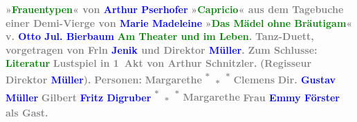            \pstart
           \centering{}\textcolor{gray}{\textbf{»\textcolor{green}{Frauentypen}{}\ledrightnote{\textcolor{green}{Frauentypen}}« von \textcolor{blue}{Arthur Pserhofer}{}\ledrightnote{\textcolor{blue}{Arthur Pserhofer}}}}\pend
           \pstart
           \noindent{}\centering{}\textcolor{gray}{\textbf{»\textcolor{green}{Capricio}{}\ledrightnote{\textcolor{green}{Auf Kypros}}« aus dem Tagebuche
                  einer Demi-Vierge von \textcolor{blue}{Marie Madeleine}{}\ledrightnote{\textcolor{blue}{Marie Madeleine}}}}\pend
           \pstart
           \noindent{}\centering{}\textcolor{gray}{\textbf{»\textcolor{green}{Das Mädel ohne Bräutigam}{}\ledrightnote{\textcolor{green}{Das Mädchen ohne Bräutigam}}« v.
                     \textcolor{blue}{Otto Jul. Bierbaum}{}\ledrightnote{\textcolor{blue}{Otto Julius Bierbaum}}}}\pend
           {\bigskip}\pstart
           \noindent{}\centering{}\textcolor{gray}{\textbf{\textcolor{green}{Am Theater und im Leben}{}\ledrightnote{\textcolor{green}{Am Theater und im Leben}}.}}\pend
           \pstart
           \noindent{}\centering{}\textcolor{gray}{\textbf{Tanz-Duett, vorgetragen von Frln \textcolor{blue}{\textbf{Jenik}}{}\ledrightnote{\textcolor{blue}{Hilda Jenik}} und Direktor \textcolor{blue}{\textbf{Müller}}{}\ledrightnote{\textcolor{blue}{Gustav Müller}}.}}\pend
           {\bigskip}\pstart
           \noindent{}\centering{}\textcolor{gray}{\textbf{Zum Schlusse:}}\pend
           \pstart
           \noindent{}\centering{}\textcolor{gray}{\textbf{\textcolor{green}{Literatur}{}\ledrightnote{\textcolor{green}{Literatur}}}}\pend
           \pstart
           \noindent{}\centering{}\textcolor{gray}{\textbf{Lustspiel in 1 Akt von Arthur Schnitzler.}}\pend
           \pstart
           \noindent{}\centering{}\textcolor{gray}{\textbf{(Regisseur Direktor \textcolor{blue}{Müller}{}\ledrightnote{\textcolor{blue}{Gustav Müller}}).}}\pend
           \pstart
           \noindent{}\centering{}\textcolor{gray}{\textbf{Personen:}}\pend
           \pstart
           \noindent{}\textcolor{gray}{\textbf{Margarethe }}\hfill \textcolor{gray}{\textbf{\textsuperscript{*} \textsubscript{*} \textsuperscript{*}}}\pend
           \pstart
           \textcolor{gray}{\textbf{Clemens }}\hfill \textcolor{gray}{\textbf{Dir. \textcolor{blue}{Gustav Müller}{}\ledrightnote{\textcolor{blue}{Gustav Müller}}}}\pend
           \pstart
           \textcolor{gray}{\textbf{Gilbert }}\hfill \textcolor{gray}{\textbf{\textcolor{blue}{Fritz Digruber}{}\ledrightnote{\textcolor{blue}{Friedrich Digruber}}}}\pend
           \pstart
           \textcolor{gray}{\textbf{\textsuperscript{*} \textsubscript{*} \textsuperscript{*} Margarethe }}\hfill \textcolor{gray}{\textbf{Frau \textcolor{blue}{Emmy Förster}{}\ledrightnote{\textcolor{blue}{Emmy Förster}} als
                     Gast.}}\pend
